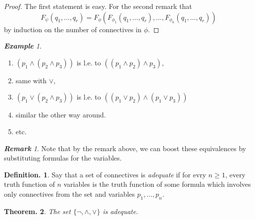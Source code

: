 \documentclass[a4paper,oneside,11pt,DIV=12,parskip=half]{scrartcl}
\theoremstyle{plain}
\newtheorem{theorem}{Theorem.}[section]
\theoremstyle{definition}
\newtheorem{definition}[theorem]{Definition.}
\newtheorem{remark, definition}[theorem]{Remark and Definition.}
\newtheorem{lemma, definition}[theorem]{Lemma and Definition.}
\newtheorem{theorem, definition}[theorem]{Theorem and Definition.}
\theoremstyle{remark}
\newtheorem*{remark}{\textbf{Remark}}
\newtheorem*{example}{\textbf{Example}}
\newtheorem*{remark, example}{\textbf{Remark and Exercise}}
\begin{document}
\begin{proof}
The first statement is easy. For the second remark that
	\[ F_{\psi}(q_1, \dots, q_r) = F_{\phi}(F_{\phi_1}(q_1, \dots, q_r), \dots, F_{\phi_n}(q_1, \dots, q_r)) \]
by induction on the number of connectives in $\phi$.
\end{proof}

\begin{example}
\begin{enumerate}
\item $(p_1 \land ( p_2 \land p_3))$ is l.e. to $((p_1 \land p_2) \land p_3)$,
\item same with $ \lor $,
\item $(p_1 \lor (p_2 \land p_3))$ is l.e. to $((p_1 \lor p_2) \land (p_1 \lor p_3))$ 
\item similar the other way around.
\item etc.

\end{enumerate}
\end{example}

\begin{remark}
Note that by the remark above, we can boost these equivalences by substituting formulas for the variables.
\end{remark}

\begin{definition}

Say that a set of connectives is \emph{adequate} if for evry $n \geq 1$, every truth function of $n$ variables is the truth function of some formula which involves only connectives from the set and variables $p_1, \dots, p_n$.
\end{definition}

\begin{theorem}\label{Th:connectives}
The set $\{ \lnot, \land, \lor\}$ is adequate. 
\end{theorem}
\end{document}
